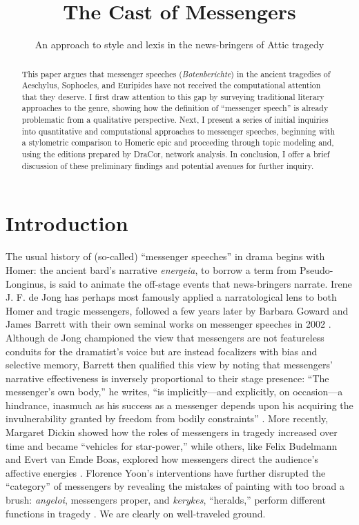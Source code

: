 \documentclass{jcls}
\title{The Cast of Messengers}
\subtitle{An approach to style and lexis in the news-bringers of Attic tragedy}
\begin{document}
\maketitle



\begin{abstract}
  This paper argues that messenger speeches (\textit{Botenberichte})
  in the ancient tragedies of Aeschylus, Sophocles, and Euripides
  have not received the computational attention that they deserve. I
  first draw attention to this gap by surveying traditional literary
  approaches to the genre, showing how the definition of ``messenger
  speech'' is already problematic from a qualitative perspective.
  Next, I present a series of initial inquiries into quantitative and
  computational approaches to messenger speeches, beginning with a
  stylometric comparison to Homeric epic and proceeding through topic
  modeling and, using the editions prepared by DraCor, network
  analysis. In conclusion, I offer a brief discussion of these
  preliminary findings and potential avenues for further inquiry.
\end{abstract}

\section{Introduction}

The usual history of (so-called) ``messenger speeches'' in drama
begins with Homer: the ancient bard's narrative \textit{energeia}, to
borrow a term from Pseudo-Longinus, is said to animate the off-stage
events that news-bringers narrate. Irene J. F. de Jong has perhaps
most famously applied a narratological lens to both Homer and tragic
messengers, followed a few years later by Barbara Goward and James
Barrett with their own seminal works on messenger speeches in 2002
\cite{deJong2011, deJong1991, Goward1999, Barrett2002}. Although de
Jong championed the view that messengers are not featureless conduits
for the dramatist's voice but are instead focalizers with bias and
selective memory, Barrett then qualified this view by noting that
messengers' narrative effectiveness is inversely proportional to
their stage presence: ``The messenger's own body,'' he writes, ``is
implicitly—and explicitly, on occasion—a hindrance, inasmuch as his
success as a messenger depends upon his acquiring the invulnerability
granted by freedom from bodily constraints'' \cite[100]{Barrett2002}.
More recently, Margaret Dickin showed how the roles of messengers in
tragedy increased over time and became ``vehicles for star-power,''
while others, like Felix Budelmann and Evert van Emde Boas, explored
how messengers direct the audience's affective energies
\cite{Dickin2009, Budelmann.vanEmdeBoas2020}. Florence Yoon's
interventions have further disrupted the ``category'' of messengers
by revealing the mistakes of painting with too broad a brush:
\textit{angeloi}, messengers proper, and \textit{kerykes},
``heralds,'' perform different functions in tragedy \cite{Yoon2022}.
We are clearly on well-traveled ground.
\end{document}
